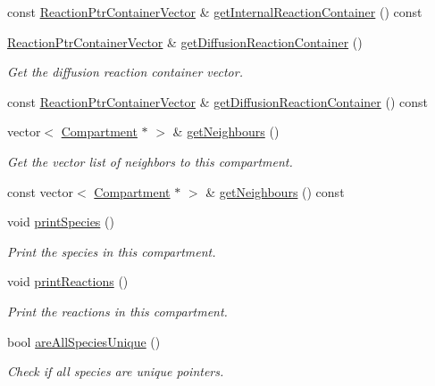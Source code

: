 \begin{DoxyCompactItemize}
const \hyperlink{classReactionPtrContainerVector}{Reaction\+Ptr\+Container\+Vector} \& \hyperlink{classCompartment_aa8eafac52244f896c70c406c825900bc}{get\+Internal\+Reaction\+Container} () const 
\item 
\hyperlink{classReactionPtrContainerVector}{Reaction\+Ptr\+Container\+Vector} \& \hyperlink{classCompartment_a3325e1dfc31a11938ebdbb78c00841a8}{get\+Diffusion\+Reaction\+Container} ()
\begin{DoxyCompactList}\small\item\em Get the diffusion reaction container vector. \end{DoxyCompactList}\item 
const \hyperlink{classReactionPtrContainerVector}{Reaction\+Ptr\+Container\+Vector} \& \hyperlink{classCompartment_af65cbf7133eac499a37ab6ac30eb333f}{get\+Diffusion\+Reaction\+Container} () const 
\item 
vector$<$ \hyperlink{classCompartment}{Compartment} $\ast$ $>$ \& \hyperlink{classCompartment_ad094a998b6b9046b37a8058fc9d47ada}{get\+Neighbours} ()
\begin{DoxyCompactList}\small\item\em Get the vector list of neighbors to this compartment. \end{DoxyCompactList}\item 
const vector$<$ \hyperlink{classCompartment}{Compartment} $\ast$ $>$ \& \hyperlink{classCompartment_a81fec9fb0f181c32dc296ab34b2959ab}{get\+Neighbours} () const 
\item 
void \hyperlink{classCompartment_a8479bfb1332a4ed42958a118fe8b2853}{print\+Species} ()
\begin{DoxyCompactList}\small\item\em Print the species in this compartment. \end{DoxyCompactList}\item 
void \hyperlink{classCompartment_abd31de24a008bb534858b627a3a53040}{print\+Reactions} ()
\begin{DoxyCompactList}\small\item\em Print the reactions in this compartment. \end{DoxyCompactList}\item 
bool \hyperlink{classCompartment_a1f1ea88f53d402aa22e68cfdcc0a9333}{are\+All\+Species\+Unique} ()
\begin{DoxyCompactList}\small\item\em Check if all species are unique pointers. \end{DoxyCompactList}\item 

\end{DoxyCompactItemize}
